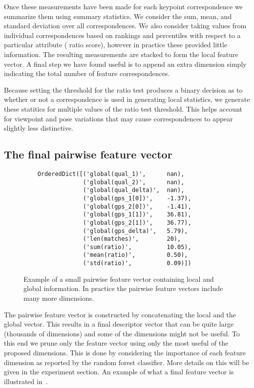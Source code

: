 Once these measurements have been made for each keypoint correspondence we
  summarize them using summary statistics.
We consider the sum, mean, and standard deviation over all correspondences.
We also consider taking values from individual correspondences based on
  rankings and percentiles with respect to a particular attribute (\eg{} ratio
  score), however in practice these provided little information.
The resulting measurements are stacked to form the local feature vector.
A final step we have found useful is to append an extra dimension simply
  indicating the total number of feature correspondences.

Because setting the threshold for the ratio test produces a binary decision as
  to whether or not a correspondence is used in generating local statistics, we
  generate these statitics for multiple values of the ratio test threshold.
This helps account for viewpoint and pose variations that may cause
  correspondences to appear slightly less distinctive.

\subsection{The final pairwise feature vector}

\begin{figure}
\begin{verbatim}
    OrderedDict([('global(qual_1)',      nan),
                 ('global(qual_2)',      nan),
                 ('global(qual_delta)',  nan),
                 ('global(gps_1[0])',    -1.37),
                 ('global(gps_2[0])',    -1.41),
                 ('global(gps_1[1])',    36.81),
                 ('global(gps_2[1])',    36.77),
                 ('global(gps_delta)',   5.79),
                 ('len(matches)',        20),
                 ('sum(ratio)',          10.05),
                 ('mean(ratio)',         0.50),
                 ('std(ratio)',          0.09)])
\end{verbatim}
\caption[A pairwise feature vector]{
Example of a small pairwise feature vector containing local and global
information. In practice the pairwise feature vectors include many more
dimensions.
}
\label{fig:PairFeatVec}
\end{figure}

The pairwise feature vector is constructed by concatenating the local and the
  global vector.
This results in a final descriptor vector that can be quite large (thousands
  of dimensions) and some of the dimensions might not be useful.
To this end we prune only the feature vector using only the most useful of the
  proposed dimensions.
This is done by considering the importance of each feature dimension as
  reported by the random forest classifier.
More details on this will be given in the experiment section.
An example of what a final feature vector is illustrated
  in~.


